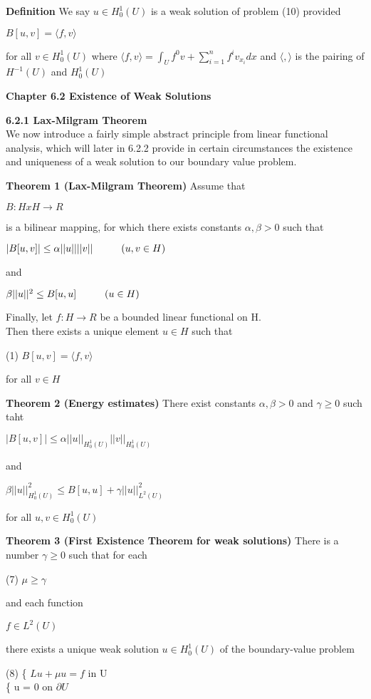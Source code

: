 \documentclass{article}
\newcommand\tab[1][1cm]{\hspace*{#1}}
\begin{document}
\textbf {Definition} We say $u \in H_0^1(U)$ is a weak solution of problem (10) provided 
\begin{center}
$B[u,v] = \langle f, v \rangle$
\end{center}
for all $v \in H_0^1(U)$ where $\langle f, v \rangle = \int_U f^0 v + \sum_{i=1}^n f^i v_{x_{i}} dx$ and $\langle , \rangle$ is the pairing of $H^{-1}(U)$ and $H_0^1(U)$

\textbf {Chapter 6.2 Existence of Weak Solutions} 

\textbf {6.2.1 Lax-Milgram Theorem} \\ We now introduce a fairly simple abstract principle from linear functional analysis, which will later in 6.2.2 provide in certain circumstances the existence and uniqueness of a weak solution to our boundary value problem.

\textbf {Theorem 1 (Lax-Milgram Theorem)} Assume that
\begin{center}
$B : H x H \to R$
\end{center}
is a bilinear mapping, for which there exists constants $\alpha, \beta > 0$ such that
\begin{center}
$|B[u,v]| \leq \alpha ||u|| ||v|| \tab (u,v \in H)$
\end{center}
and 
\begin{center}
$\beta ||u||^2 \leq B[u,u] \tab (u \in H)$
\end{center}
Finally, let $f: H \to R$ be a bounded linear functional on H. \\
\tab Then there exists a unique element $u \in H$ such that
\begin{center}
(1) \tab $B[u,v] = \langle f, v \rangle$
\end{center}
for all $v \in H$

\textbf {Theorem 2 (Energy estimates)} There exist constants $\alpha, \beta > 0$ and $\gamma \geq 0$ such taht
\begin{center}
$|B[u,v]| \leq \alpha ||u||_{H_{0}^{1}(U)}||v||_{H_{0}^{1}(U)}$
\end{center}
and 
\begin{center}
$\beta ||u||^{2}_{H_{0}^{1}(U)} \leq B[u,u] + \gamma ||u||^{2}_{L^{2}(U)}$
\end{center}
for all $u, v \in H_{0}^{1}(U)$

\textbf {Theorem 3 (First Existence Theorem for weak solutions)} There is a number $\gamma \geq 0$ such that for each
\begin{center}
(7) \tab $\mu \geq \gamma$
\end{center}
and each function
\begin{center}
$f \in L^2(U)$
\end{center}
there exists a unique weak solution $u \in H_0^1(U)$ of the boundary-value problem
\begin{center}
(8) \tab \{ $Lu + \mu u = f$ \tab in U \\
\tab \{ u = 0 \tab on $\partial U$
\end{center}
\end{document}
